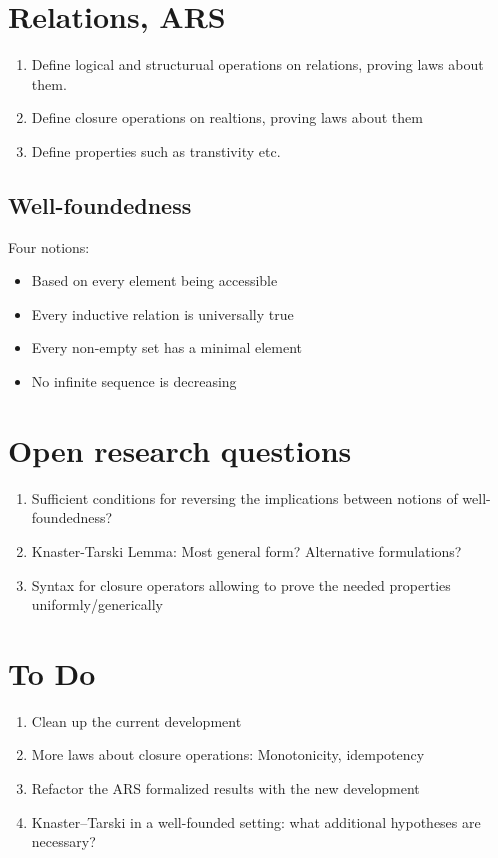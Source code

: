 \documentclass{scrartcl}
\begin{document}
\section{Relations, ARS}


\begin{enumerate}
  \item Define logical and structurual operations on relations, proving laws about them.
  \item Define closure operations on realtions, proving laws about them
  \item Define properties such as transtivity etc.
\end{enumerate}
 
\subsection{Well-foundedness}

Four notions:
\begin{itemize}
  \item Based on every element being accessible
  \item Every inductive relation is universally true
  \item Every non-empty set has a minimal element
  \item No infinite sequence is decreasing
\end{itemize}



\section{Open research questions}
\begin{enumerate}
  \item Sufficient conditions for reversing the implications between notions of 
  well-foundedness?
  \item Knaster-Tarski Lemma: Most general form? Alternative formulations?
  \item Syntax for closure operators allowing to prove the needed properties
  uniformly/generically
\end{enumerate}

\section{To Do}
\begin{enumerate}
  \item Clean up the current development
  \item More laws about closure operations: Monotonicity, idempotency
  \item Refactor the ARS formalized results with the new development
  \item Knaster--Tarski in a well-founded setting: what additional
  hypotheses are necessary?
\end{enumerate}
\end{document}
